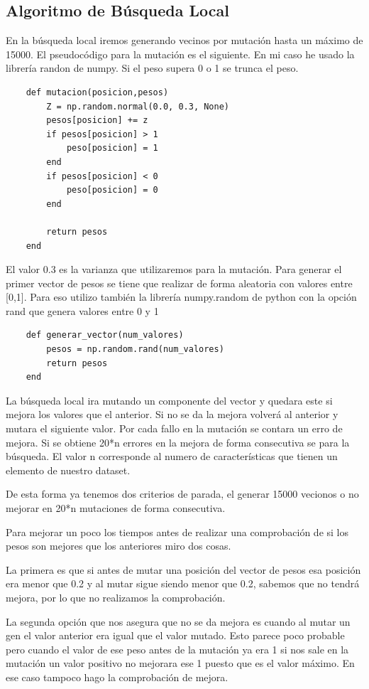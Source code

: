 \documentclass[titlepage]{article}
\begin{document}
	\subsection{Algoritmo de Búsqueda Local}
	En la búsqueda local iremos generando vecinos por mutación hasta un máximo de 15000.
	El pseudocódigo para la mutación es el siguiente. En mi caso he usado la librería randon de numpy. Si el peso supera 0 o 1 se trunca el peso.
	
	\begin{lstlisting}
	def mutacion(posicion,pesos)
		Z = np.random.normal(0.0, 0.3, None)
		pesos[posicion] += z
		if pesos[posicion] > 1 
			peso[posicion] = 1
		end 
		if pesos[posicion] < 0
			peso[posicion] = 0
		end 
			
		return pesos
	end
	\end{lstlisting}
	
	El valor 0.3 es la varianza que utilizaremos para la mutación.
	Para generar el primer vector de pesos se tiene que realizar de forma aleatoria con valores entre [0,1]. Para eso utilizo también la librería numpy.random de python con la opción rand que genera valores entre 0 y 1
	
	\begin{lstlisting}
	def generar_vector(num_valores)
		pesos = np.random.rand(num_valores)
		return pesos
	end
	\end{lstlisting}
	
	La búsqueda local ira mutando un componente del vector y quedara este si mejora los valores que el anterior. Si no se da la mejora volverá al anterior y mutara el siguiente valor. Por cada fallo en la mutación se contara un erro de mejora. Si se obtiene 20*n errores en la mejora de forma consecutiva se para la búsqueda. El valor n corresponde al numero de características que tienen un elemento de nuestro dataset.
	
	De esta forma ya tenemos dos criterios de parada, el generar 15000 vecionos o no mejorar en 20*n mutaciones de forma consecutiva.
	
	Para mejorar un poco los tiempos antes de realizar una comprobación de si los pesos son mejores que los anteriores miro dos cosas.
	
	La primera es que si antes de mutar una posición del vector de pesos esa posición era menor que 0.2 y al mutar sigue siendo menor que 0.2, sabemos que no tendrá mejora, por lo que no realizamos la comprobación.
	
	La segunda opción que nos asegura que no se da mejora es cuando al mutar un gen el valor anterior era igual que el valor mutado. Esto parece poco probable pero cuando el valor de ese peso antes de la mutación ya era 1 si nos sale en la mutación un valor positivo no mejorara ese 1 puesto que es el valor máximo. En ese caso tampoco hago la comprobación de mejora.
	
\end{document}
